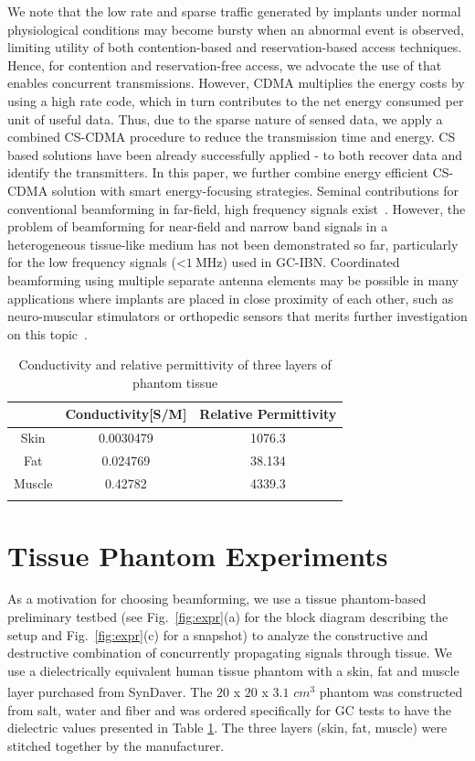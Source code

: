 We note that the low rate and sparse traffic generated by implants under normal physiological conditions may become bursty when an abnormal event is observed,  limiting utility of both contention-based and reservation-based access techniques. Hence, for contention and reservation-free access, we advocate the use of \cite{cdma} that enables concurrent transmissions. However, CDMA multiplies the energy costs by using a high rate code, which in turn contributes to the net energy consumed per unit of useful data. Thus, due to the sparse nature of sensed data, we apply a combined CS-CDMA procedure to reduce the transmission time and energy. CS based solutions have been already successfully applied \cite{candes} -\cite{alesii} to both recover data and identify the transmitters. In this paper, we further combine energy efficient CS-CDMA solution with smart energy-focusing strategies. Seminal contributions for conventional beamforming in far-field, high frequency signals exist~\cite{UWBBF}. However, the problem of beamforming for near-field and narrow band signals in a heterogeneous tissue-like medium has not been demonstrated so far, particularly for the low frequency signals (\textless $1\ \mathrm{MHz}$) used in GC-IBN. Coordinated beamforming using multiple separate antenna elements may be possible in many applications where implants are placed in close proximity of each other, such as neuro-muscular stimulators or orthopedic sensors that merits further investigation on this topic~\cite{cyborgs,ortho2}.
\begin{table}[h]
\caption{Conductivity and relative permittivity of three layers of phantom tissue \cite{dielec}}
\begin{center}
\begin{tabular}{ c||c|c|}
&Conductivity[S/M] & Relative Permittivity\\
\hline
Skin & 0.0030479 & 1076.3 \\
\hline
Fat & 0.024769 & 38.134 \\
\hline
Muscle & 0.42782 & 4339.3 \\
\hline 
\label{dielectric}
\end{tabular}
\end{center}
\vspace{-2pt}
\end{table}
\section{Tissue Phantom Experiments}
\label{sec:exp}
As a motivation for choosing beamforming, we use a tissue phantom-based preliminary testbed (see  Fig.~\ref{fig:expr}(a) for the block diagram describing the setup and Fig.~\ref{fig:expr}(c) for a snapshot) to analyze the constructive and destructive combination of concurrently propagating signals through tissue. We use a dielectrically equivalent human tissue phantom with a skin, fat and muscle layer purchased from SynDaver\textsuperscript{\textregistered}. The $20$ x $20$ x $3.1$  $cm^3$ phantom was constructed from salt, water and fiber and was ordered specifically for GC tests to have the dielectric values presented in Table \ref{dielectric}. The three layers (skin, fat, muscle) were stitched together by the manufacturer.

